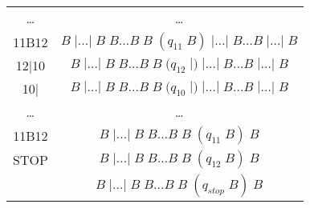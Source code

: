 \documentclass[a4paper, 12pt]{article}  %
\theoremstyle{definition}
\begin{document}
\begin{tabular}{ | c | c | }
		\dots & \dots \\
		11B12 & $ B \; | \dots | \; B \; B \dots B \; B \; (q_{11} \; B) \; | \dots | \; B \dots  B \; | \dots | \; B$ \\
		12|10 & $ B \; | \dots | \; B \; B \dots B \; B \; (q_{12} \; |) \; | \dots | \; B \dots  B \; | \dots | \; B$ \\
		10| & $ B \; | \dots | \; B \; B \dots B \; B \; (q_{10} \; |) \; | \dots | \; B \dots  B \; | \dots | \; B$ \\
		\dots & \dots \\
		11B12 & $ B \; | \dots | \; B \; B \dots B \; B \; (q_{11} \; B) \; B$\\
		STOP & $ B \; | \dots | \; B \; B \dots B \; B \; (q_{12} \; B) \; B$\\
		& $ B \; | \dots | \; B \; B \dots B \; B \; (q_{stop} \; B) \; B$\\
		\hline
	\end{tabular}
	
\end{document}
